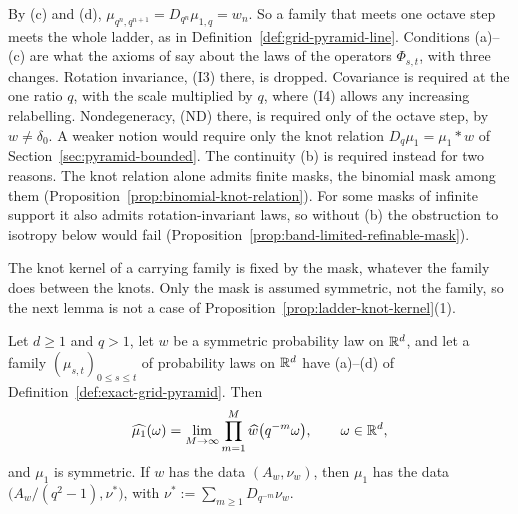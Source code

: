 By (c) and (d), $\mu_{q^n, q^{n+1}} = D_{q^n}\mu_{1,q} = w_n$. So a family that meets one octave
step meets the whole ladder, as in Definition~\ref{def:grid-pyramid-line}. Conditions (a)--(c) are
what the axioms of  say about the laws of the operators
$\Phi_{s,t}$, with three changes. Rotation invariance, (I3) there, is dropped. Covariance is
required at the one ratio $q$, with the scale multiplied by $q$, where (I4) allows any increasing
relabelling. Nondegeneracy, (ND) there, is required only of the octave step, by $w \ne \delta_0$. A weaker notion would require only the knot relation
$D_q\mu_1 = \mu_1 * w$ of Section~\ref{sec:pyramid-bounded}. The continuity (b) is required instead
for two reasons. The knot relation alone admits finite masks, the binomial mask among them
(Proposition~\ref{prop:binomial-knot-relation}). For some masks of infinite support it also admits
rotation-invariant laws, so without (b) the obstruction to isotropy below would fail
(Proposition~\ref{prop:band-limited-refinable-mask}).

The knot kernel of a carrying family is fixed by the mask, whatever the family does between
the knots. Only the mask is assumed symmetric, not the family, so the next lemma is not a case of
Proposition~\ref{prop:ladder-knot-kernel}(1).

\begin{lemma}
\label{lem:knot-data}

Let $d \ge 1$ and $q > 1$, let $w$ be a symmetric probability law on $\mathbb{R}^d$, and let a family
$(\mu_{s,t})_{0 \le s \le t}$ of probability laws on $\mathbb{R}^d$ have (a)--(d) of
Definition~\ref{def:exact-grid-pyramid}. Then
\[
  \widehat{\mu_1}(\omega) = \lim_{M \to \infty}\prod_{m=1}^M\widehat{w}\bigl(q^{-m}\omega\bigr),
  \qquad \omega \in \mathbb{R}^d,
\]
and $\mu_1$ is symmetric. If $w$ has the \Levy{} data $(A_w, \nu_w)$, then $\mu_1$ has the data
$\bigl(A_w/(q^2 - 1), \nu^*\bigr)$, with $\nu^* := \sum_{m \ge 1}D_{q^{-m}}\nu_w$.
\end{lemma}

